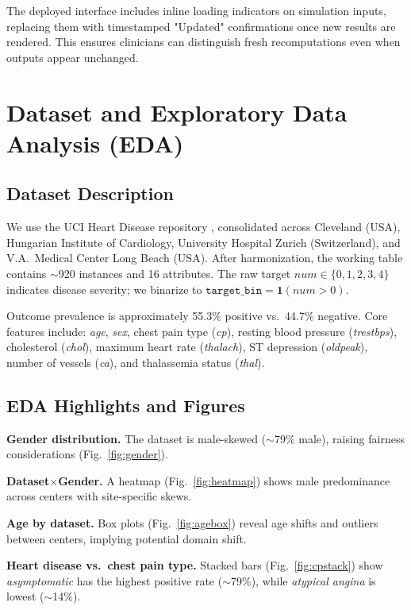 \documentclass[conference]{IEEEtran}
\begin{document}
The deployed interface includes inline loading indicators on simulation
inputs, replacing them with timestamped "Updated" confirmations once new
results are rendered. This ensures clinicians can distinguish fresh
recomputations even when outputs appear unchanged.

\section{Dataset and Exploratory Data Analysis (EDA)}
\subsection{Dataset Description}
We use the UCI Heart Disease repository \cite{uci1988}, consolidated across Cleveland (USA), Hungarian Institute of Cardiology, University Hospital Zurich (Switzerland), and V.A.\ Medical Center Long Beach (USA). After harmonization, the working table contains \(\sim\)920 instances and 16 attributes. The raw target \(num \in \{0,1,2,3,4\}\) indicates disease severity; we binarize to \(\texttt{target\_bin} = \mathbf{1}(num>0)\).

Outcome prevalence is approximately 55.3\% positive vs.\ 44.7\% negative. Core features include: \textit{age}, \textit{sex}, chest pain type (\textit{cp}), resting blood pressure (\textit{trestbps}), cholesterol (\textit{chol}), maximum heart rate (\textit{thalach}), ST depression (\textit{oldpeak}), number of vessels (\textit{ca}), and thalassemia status (\textit{thal}).

\subsection{EDA Highlights and Figures}
\textbf{Gender distribution.} The dataset is male-skewed (\(\sim\)79\% male), raising fairness considerations (Fig.~\ref{fig:gender}).

\textbf{Dataset$\times$Gender.} A heatmap (Fig.~\ref{fig:heatmap}) shows male predominance across centers with site-specific skews.

\textbf{Age by dataset.} Box plots (Fig.~\ref{fig:agebox}) reveal age shifts and outliers between centers, implying potential domain shift.

\textbf{Heart disease vs.\ chest pain type.} Stacked bars (Fig.~\ref{fig:cpstack}) show \textit{asymptomatic} has the highest positive rate ($\sim$79\%), while \textit{atypical angina} is lowest ($\sim$14\%).
\end{document}
